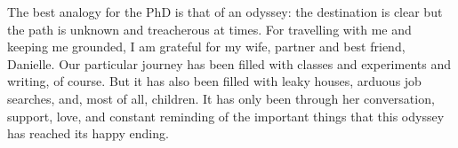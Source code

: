 \documentclass[12pt]{report}  %
\begin{document}
The best analogy for the PhD is that of an odyssey: the destination is clear but the path is unknown and treacherous at times. For travelling with me and keeping me grounded, I am grateful for my wife, partner and best friend, Danielle. Our particular journey has been filled with classes and experiments and writing, of course. But it has also been filled with leaky houses, arduous job searches, and, most of all, children. It has only been through her conversation, support, love, and constant reminding of the important things that this odyssey has reached its happy ending.


\singlespacing
\tableofcontents

\begingroup
\setlength{\parskip}{1\baselineskip}
\listoftables
\newpage
\listoffigures
\newpage
\printnomenclature
\newpage
\endgroup

\normalsize
\doublespacing
{}
\setcounter{page}{1}













\singlespacing


\end{document}
